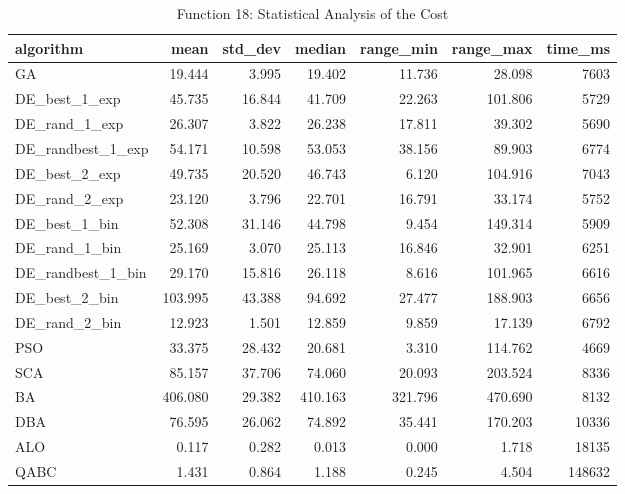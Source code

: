 \documentclass[12pt]{article}
\begin{document}
\begin{table}[H]
    \centering
    \footnotesize
    \begin{adjustbox}{width=1\textwidth}
\begin{tabular}{lrrrrrr}
\toprule
         algorithm &    mean &  std\_dev &  median &  range\_min &  range\_max &  time\_ms \\
\midrule
                GA &  19.444 &    3.995 &  19.402 &     11.736 &     28.098 &     7603 \\
     DE\_best\_1\_exp &  45.735 &   16.844 &  41.709 &     22.263 &    101.806 &     5729 \\
     DE\_rand\_1\_exp &  26.307 &    3.822 &  26.238 &     17.811 &     39.302 &     5690 \\
 DE\_randbest\_1\_exp &  54.171 &   10.598 &  53.053 &     38.156 &     89.903 &     6774 \\
     DE\_best\_2\_exp &  49.735 &   20.520 &  46.743 &      6.120 &    104.916 &     7043 \\
     DE\_rand\_2\_exp &  23.120 &    3.796 &  22.701 &     16.791 &     33.174 &     5752 \\
     DE\_best\_1\_bin &  52.308 &   31.146 &  44.798 &      9.454 &    149.314 &     5909 \\
     DE\_rand\_1\_bin &  25.169 &    3.070 &  25.113 &     16.846 &     32.901 &     6251 \\
 DE\_randbest\_1\_bin &  29.170 &   15.816 &  26.118 &      8.616 &    101.965 &     6616 \\
     DE\_best\_2\_bin & 103.995 &   43.388 &  94.692 &     27.477 &    188.903 &     6656 \\
     DE\_rand\_2\_bin &  12.923 &    1.501 &  12.859 &      9.859 &     17.139 &     6792 \\
               PSO &  33.375 &   28.432 &  20.681 &      3.310 &    114.762 &     4669 \\
               SCA &  85.157 &   37.706 &  74.060 &     20.093 &    203.524 &     8336 \\
                BA & 406.080 &   29.382 & 410.163 &    321.796 &    470.690 &     8132 \\
               DBA &  76.595 &   26.062 &  74.892 &     35.441 &    170.203 &    10336 \\
               ALO &   0.117 &    0.282 &   0.013 &      0.000 &      1.718 &    18135 \\
              QABC &   1.431 &    0.864 &   1.188 &      0.245 &      4.504 &   148632 \\
\bottomrule
\end{tabular}


    \end{adjustbox}
    \caption{Function 18: Statistical Analysis of the Cost} 
    \end{table}
\end{document}
